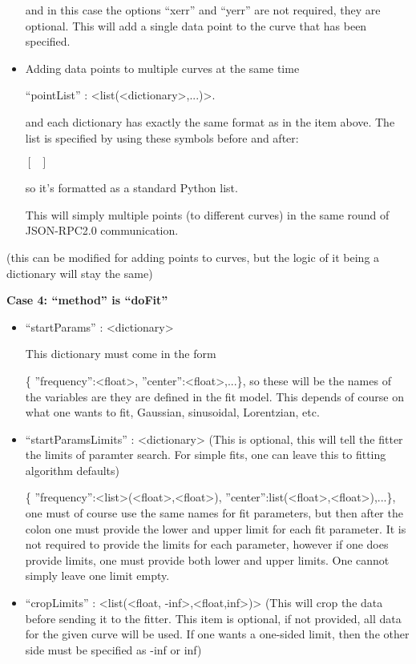 \documentclass[11pt]{article} %
\begin{document}
\begin{tcolorbox}[breakable,title=Sending ``params'' to the server]
\begin{itemize}
and in this case the options ``xerr'' and ``yerr'' are not required, they are optional. This will 
add a single data point to the curve that has been specified.

\item Adding data points to multiple curves at the same time


 ``pointList'' : <list(<dictionary>,...)>. 

and each dictionary has exactly the same format as in the item above. 
The list is specified by using these symbols before and after:

{ $[ ~~~ ]$ }

so it's formatted as a standard Python list.

This will simply multiple points (to different curves) 
in the same round of JSON-RPC2.0 communication. 

\end{itemize}

(this can be modified for adding points to curves, but the logic of it being a dictionary will stay the same)

\textbf{Case 4: ``method'' is ``doFit''}
\begin{itemize}
\item ``startParams'' : <dictionary>

This dictionary must come in the form 

{ \{ {''}frequency{''}:<float>, {''}center{''}:<float>,...\}}, so these will be the names
of the variables are they are defined in the fit model. This depends of course on what one wants to fit, Gaussian, sinusoidal, Lorentzian, etc.

\item ``startParamsLimits'' : <dictionary> (This is optional, this will tell the fitter the limits of paramter search. For simple fits, 
	one can leave this to fitting algorithm defaults) 

{ \{ {''}frequency{''}:<list>(<float>,<float>), {''}center{''}:list(<float>,<float>),...\}}, 
one must of course use the same names for fit parameters, but then after the colon one must provide the lower and upper limit for each fit parameter. 
It is not required to provide the limits for each parameter, however if one does provide limits, one must provide both lower and upper limits. 
One cannot simply leave one limit empty.

\item ``cropLimits'' : <list(<float, -inf>,<float,inf>)> (This will crop the data before sending it to the fitter. 
This item is optional, if not provided, all data for the given curve will be used.
If one wants a one-sided limit, then the other side must be specified as -inf or inf)


\end{itemize}
\end{tcolorbox}
\end{document}
